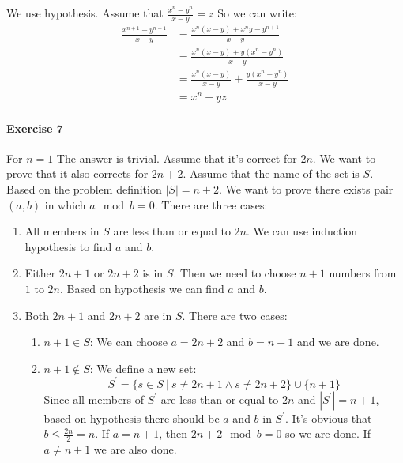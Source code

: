 \documentclass{book}
\begin{document}
	We use hypothesis. Assume that $\frac{x^n - y^n}{x - y} = z$ So we can write:
	\begin{equation*}
		\begin{split}
			\frac{x^{n + 1} - y^{n + 1}}{x - y} &= \frac{x^n(x - y) + x^ny-y^{n + 1}}{x - y} \\
			&= \frac{x^n(x - y) + y(x^n - y^n)}{x - y} \\
			&= \frac{x^n(x - y)}{x - y} + \frac{y(x^n - y^n)}{x - y} \\
			&= x^n + yz
		\end{split}
	\end{equation*}

	\paragraph{Exercise 7}
	For $n = 1$ The answer is trivial. Assume that it's correct for $2n$. We want to prove that it also corrects for $2n + 2$. Assume that the name of the set is $S$. Based on the problem definition $|S| = n + 2$. We want to prove there exists pair $(a, b)$ in which $a \mod b = 0$. There are three cases:
	\begin{enumerate}
		\item All members in $S$ are less than or equal to $2n$. We can use induction hypothesis to find $a$ and $b$.
		\item Either $2n + 1$ or $2n + 2$ is in $S$. Then we need to choose $n + 1$ numbers from $1$ to $2n$. Based on hypothesis we can find $a$ and $b$.
		\item Both $2n + 1$ and $2n + 2$ are in $S$. There are two cases:
		\begin{enumerate}
			\item $n + 1 \in S$: We can choose $a = 2n + 2$ and $b = n + 1$ and we are done.
			\item $n + 1 \notin S$: We define a new set:
			\begin{equation*}
				S^\prime = \{s \in S\ |\ s \ne 2n + 1 \land s \ne 2n + 2\} \cup \{n + 1\}
			\end{equation*}
		Since all members of $S^\prime$ are less than or equal to $2n$ and $|S^\prime| = n + 1$, based on hypothesis there should be $a$ and $b$ in $S^\prime$. It's obvious that $b \le \frac{2n}{2} = n$. If $a = n + 1$, then $2n + 2 \mod b = 0$ so we are done. If $a \ne n + 1$ we are also done.
		\end{enumerate}
	\end{enumerate}
\end{document}

